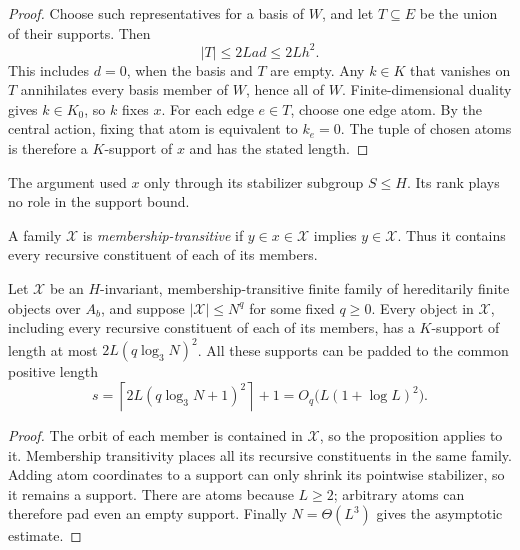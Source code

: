\begin{proof}
Choose such representatives for a basis of $W$, and let $T\subseteq E$
be the union of their supports. Then
\[
 |T|\le2Lad\le2Lh^2.
\]
This includes $d=0$, when the basis and $T$ are empty. Any $k\in K$
that vanishes on $T$ annihilates every basis member of $W$, hence all
of $W$. Finite-dimensional duality gives $k\in K_0$, so $k$ fixes $x$.
For each edge $e\in T$, choose one edge atom. By the central action,
fixing that atom is equivalent to $k_e=0$. The tuple of chosen atoms
is therefore a $K$-support of $x$ and has the stated length.
\end{proof}

The argument used $x$ only through its stabilizer subgroup $S\le H$.
Its rank plays no role in the support bound.

A family $\mathcal X$ is \emph{membership-transitive} if
$y\in x\in\mathcal X$ implies $y\in\mathcal X$. Thus it contains
every recursive constituent of each of its members.

\begin{corollary}\label{cor:transitive-support}
Let $\mathcal X$ be an $H$-invariant, membership-transitive finite family
of hereditarily finite objects over $A_b$, and suppose
$|\mathcal X|\le N^q$ for some fixed $q\ge0$. Every object in
$\mathcal X$, including every recursive constituent of each of its
members, has a $K$-support of length at most $2L(q\log_3N)^2$.
All these supports can be padded to the common positive length
\begin{equation}\label{eq:support-length}
 s=\left\lceil2L(q\log_3N+1)^2\right\rceil+1
   =O_q\bigl(L(1+\log L)^2\bigr).
\end{equation}
\end{corollary}
\begin{proof}
The orbit of each member is contained in $\mathcal X$, so the proposition
applies to it. Membership transitivity places all its recursive
constituents in the same family. Adding atom coordinates to a support
can only shrink its pointwise stabilizer, so it remains a support.
There are atoms because $L\ge2$; arbitrary atoms can therefore pad even
an empty support. Finally $N=\Theta(L^3)$ gives the asymptotic estimate.
\end{proof}
